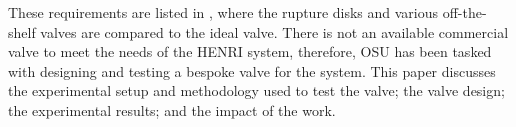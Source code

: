 These requirements are listed in , where the rupture disks and various off-the-shelf valves are compared to the ideal valve. There is not an available commercial valve to meet the needs of the HENRI system, therefore, OSU has been tasked with designing and testing a bespoke valve for the system. This paper discusses the experimental setup and methodology used to test the valve; the valve design; the experimental results; and the impact of the work.

